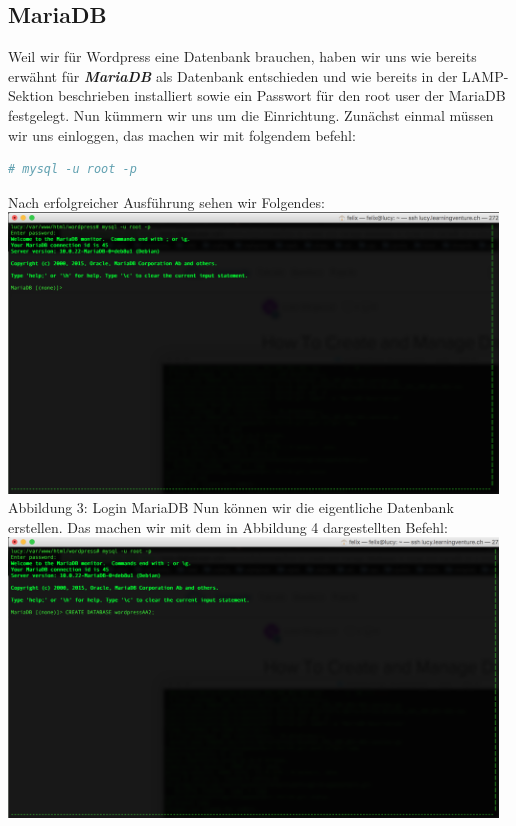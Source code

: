 \documentclass{article}
\begin{document}
	\subsection{MariaDB}
	Weil wir für Wordpress eine Datenbank brauchen, haben wir uns wie bereits erwähnt für \textit{\textbf{MariaDB}} als Datenbank entschieden und wie bereits in der LAMP-Sektion beschrieben installiert sowie ein Passwort für den root user der MariaDB festgelegt. Nun kümmern wir uns um die Einrichtung.
	\newline
	\newline
	Zunächst einmal müssen wir uns einloggen, das machen wir mit folgendem befehl:
	\begin{lstlisting}[language=bash]
	# mysql -u root -p
	\end{lstlisting}
	Nach erfolgreicher Ausführung sehen wir Folgendes:
	\newline
	\includegraphics[width=13cm]{../Pics/21-maria-db-login-success}
	Abbildung 3: Login MariaDB
	\newline
	\newline
	Nun können wir die eigentliche Datenbank erstellen. Das machen wir mit dem in Abbildung 4 dargestellten Befehl:
	\newline
	\newline
	\includegraphics[width=13cm]{../Pics/22-maria-db-create}
\end{document}
